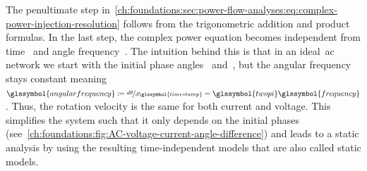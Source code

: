 The penultimate step
in~\cref{ch:foundations:sec:power-flow-analyses:eq:complex-power-injection-resolution}
follows from the trigonometric addition and product formulas. In the last step,
the complex power equation becomes independent from time~ and angle
frequency~. The intuition behind this is that in an
ideal~\gls{ac} network we start with the initial phase
angles~ and~, but the angular
frequency stays constant
meaning~$\glssymbol{angularfrequency}\coloneqq\nicefrac{d\aangle}{d\glssymbol{timestamp}} =
\glssymbol{twopi}\glssymbol{frequency}$. Thus, the rotation velocity is the same
for
both current and voltage. This simplifies the system such that it only depends
on the initial phases
(see~\cref{ch:foundations:fig:AC-voltage-current-angle-difference}) and leads
to a static analysis by using the resulting time-independent models that are
also called static models.
% 
